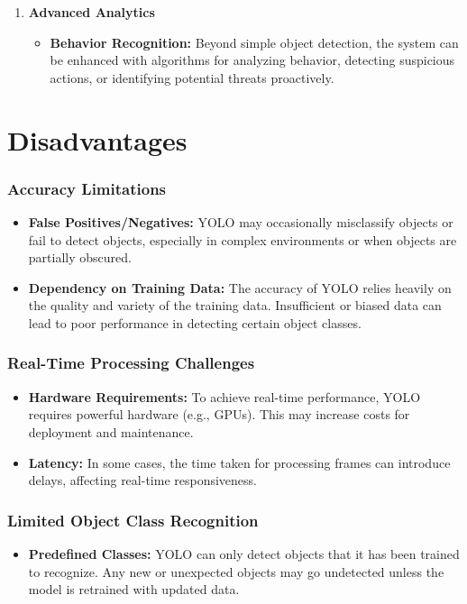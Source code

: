 \documentclass[openany,12pt]{report}
\begin{document}
\begin{enumerate}
    \item \textbf{Advanced Analytics}
    \begin{itemize}
        \item \textbf{Behavior Recognition:} Beyond simple object detection, the system can be enhanced with algorithms for analyzing behavior, detecting suspicious actions, or identifying potential threats proactively.
    \end{itemize}
    
\end{enumerate}




\chapter {Disadvantages}

\subsection*{Accuracy Limitations}
\begin{itemize}
    \item \textbf{False Positives/Negatives:} YOLO may occasionally misclassify objects or fail to detect objects, especially in complex environments or when objects are partially obscured.
    \item \textbf{Dependency on Training Data:} The accuracy of YOLO relies heavily on the quality and variety of the training data. Insufficient or biased data can lead to poor performance in detecting certain object classes.
\end{itemize}

\subsection*{Real-Time Processing Challenges}
\begin{itemize}
    \item \textbf{Hardware Requirements:} To achieve real-time performance, YOLO requires powerful hardware (e.g., GPUs). This may increase costs for deployment and maintenance.
    \item \textbf{Latency:} In some cases, the time taken for processing frames can introduce delays, affecting real-time responsiveness.
\end{itemize}

\subsection*{Limited Object Class Recognition}
\begin{itemize}
    \item \textbf{Predefined Classes:} YOLO can only detect objects that it has been trained to recognize. Any new or unexpected objects may go undetected unless the model is retrained with updated data.
\end{itemize}
\end{document}
